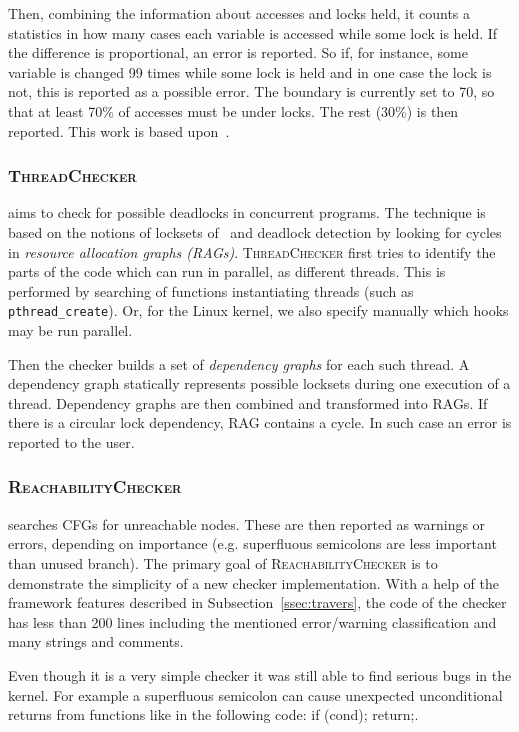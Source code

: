 \documentclass{llncs}
\newcommand{\TC}{\textsc{ThreadChecker}\xspace}
\newcommand{\RC}{\textsc{ReachabilityChecker}\xspace}
\begin{document}
Then, combining the information about accesses and locks held, it
counts a statistics in how many cases each variable is accessed while some
lock is held. If the difference is proportional, an error is reported. So if,
for instance, some variable is changed 99 times while some lock is held and in
one case the lock is not, this is reported as a possible error. The boundary
is currently set to 70, so that at least 70\% of accesses must be under locks.
The rest (30\%) is then reported. This work is based upon~\cite{lockchecker}.

\subsubsection{\TC}
aims to check for possible deadlocks in concurrent programs. The technique
is based on the notions of locksets of~\cite{relay} and deadlock detection
by looking for cycles in \emph{resource allocation graphs (RAGs)}. \TC first
tries to identify the parts of the code which can run in parallel, as
different threads. This is performed by searching of functions instantiating
threads (such as \texttt{pthread\_create}). Or, for the Linux kernel, we also
specify manually which hooks may be run parallel.

Then the checker builds a set of \emph{dependency graphs} for each such
thread. A dependency graph statically represents possible locksets during
one execution of a thread. Dependency graphs are then combined and transformed
into RAGs. If there is a circular lock dependency, RAG contains a cycle. In
such case an error is reported to the user.

\subsubsection{\RC}
searches CFGs for unreachable nodes. These are then reported as warnings or
errors, depending on importance (e.g. superfluous semicolons are less
important than unused branch). The primary goal of \RC is to demonstrate the
simplicity of a new checker implementation. With a help of the framework
features described in Subsection~\ref{ssec:travers}, the code of the checker
has less than 200 lines including the mentioned error/warning classification
and many strings and comments.

Even though it is a very simple checker it was still able to find serious bugs
in the kernel. For example a superfluous semicolon can cause unexpected
unconditional returns from functions like in the following code: \textsf{if
(cond)\underline{;} return;}.
\end{document}
